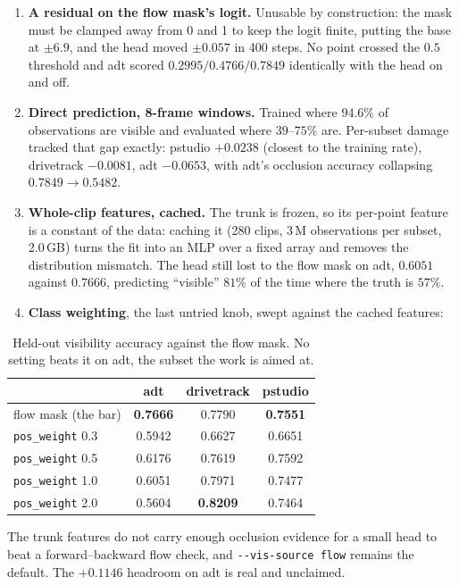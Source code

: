 \documentclass[11pt,a4paper]{article}
\begin{document}
\begin{enumerate}
  \item \textbf{A residual on the flow mask's logit.} Unusable by construction: the mask must be
        clamped away from 0 and 1 to keep the logit finite, putting the base at $\pm6.9$, and the
        head moved $\pm0.057$ in 400 steps. No point crossed the $0.5$ threshold and adt scored
        $0.2995/0.4766/0.7849$ identically with the head on and off.
  \item \textbf{Direct prediction, 8-frame windows.} Trained where $94.6\%$ of observations are
        visible and evaluated where $39$--$75\%$ are. Per-subset damage tracked that gap exactly:
        pstudio $+0.0238$ (closest to the training rate), drivetrack $-0.0081$, adt $-0.0653$,
        with adt's occlusion accuracy collapsing $0.7849\to0.5482$.
  \item \textbf{Whole-clip features, cached.} The trunk is frozen, so its per-point feature is a
        constant of the data: caching it (280 clips, 3\,M observations per subset, 2.0\,GB) turns
        the fit into an MLP over a fixed array and removes the distribution mismatch. The head
        still lost to the flow mask on adt, $0.6051$ against $0.7666$, predicting ``visible''
        $81\%$ of the time where the truth is $57\%$.
  \item \textbf{Class weighting}, the last untried knob, swept against the cached features:
\end{enumerate}

\begin{table}[h]
\centering
\caption{Held-out visibility accuracy against the flow mask. No setting beats it on adt, the
subset the work is aimed at.}
\label{tab:vis-posweight}
\begin{tabular}{lccc}
\toprule
 & adt & drivetrack & pstudio \\
\midrule
flow mask (the bar) & \textbf{0.7666} & 0.7790 & \textbf{0.7551} \\
\midrule
\texttt{pos\_weight} 0.3 & 0.5942 & 0.6627 & 0.6651 \\
\texttt{pos\_weight} 0.5 & 0.6176 & 0.7619 & 0.7592 \\
\texttt{pos\_weight} 1.0 & 0.6051 & 0.7971 & 0.7477 \\
\texttt{pos\_weight} 2.0 & 0.5604 & \textbf{0.8209} & 0.7464 \\
\bottomrule
\end{tabular}
\end{table}

The trunk features do not carry enough occlusion evidence for a small head to beat a
forward--backward flow check, and \texttt{-{}-vis-source flow} remains the default. The $+0.1146$
headroom on adt is real and unclaimed.
\end{document}
